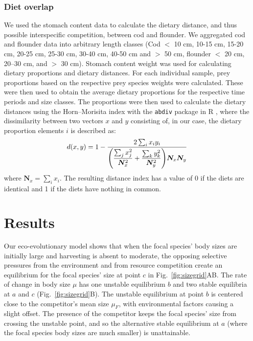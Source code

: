 \documentclass[12pt]{article}
\newcommand{\mat}[1]{\bm{#1}}
\let\originalleft\left
\let\originalright\right
\renewcommand{\left}{\mathopen{}\mathclose\bgroup\originalleft}
\renewcommand{\right}{\aftergroup\egroup\originalright}
\begin{document}
\subsubsection*{Diet overlap}
We used the stomach content data to calculate the dietary distance, and thus possible interspecific competition, between cod and flounder. We aggregated cod and flounder data into arbitrary length classes (Cod $<$ 10 cm, 10-15 cm, 15-20 cm, 20-25 cm, 25-30 cm, 30-40 cm, 40-50 cm and $>$ 50 cm, flounder $<$ 20 cm, 20--30 cm, and $>$ 30 cm). Stomach content weight was used for calculating dietary proportions and dietary distances. For each individual sample, prey proportions based on the respective prey species weights were calculated. These were then used to obtain the average dietary proportions for the respective time periods and size classes. The proportions were then used to calculate the dietary distances using the Horn--Morisita index with the \texttt{abdiv} package \citep[version 0.2.0,][]{Bittinger2020} in R \citep{R}, where the dissimilarity between two vectors $x$ and $y$ consisting of, in our case, the dietary proportion elements $i$ is described as:
\begin{equation}
  \label{eq-mori}
  d(x,y)
  = 1 - \frac{2 \sum_i x_i y_i}{\left( \dfrac{\sum_j x_j^2 }{\mat{N}_x^2} + \dfrac{\sum_k y_k^2 }{\mat{N}_y^2} \right) \mat{N}_x\mat{N}_y}
\end{equation}
where $\mat{N}_x = \sum_i x_i$. The resulting distance index has a value of 0 if the diets are identical and 1 if the diets have nothing in common.


\section*{Results}

Our eco-evolutionary model shows that when the focal species' body sizes are initially large and harvesting is absent to moderate, the opposing selective pressures from the environment and from resource competition create an equilibrium for the focal species' size at point $c$ in Fig.~\ref{fig:sizegrid}AB. The rate of change in body size $\mu$ has one unstable equilibrium $b$ and two stable equilibria at $a$ and $c$ (Fig.~\ref{fig:sizegrid}B). The unstable equilibrium at point $b$ is centered close to the competitor's mean size $\mu_{F}$, with environmental factors causing a slight offset. The presence of the competitor keeps the focal species' size from crossing the unstable point, and so the alternative stable equilibrium at $a$ (where the focal species body sizes are much smaller) is unattainable.
\end{document}
